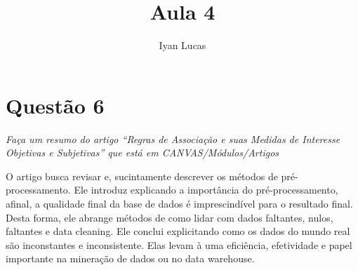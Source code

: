 \documentclass[oneside]{article}            %
\title{Aula 4}
\author{Iyan Lucas}
\begin{document}
\maketitle
\section{Questão 6}

\textit{Faça um resumo do artigo “Regras de Associação e suas Medidas de Interesse Objetivas e Subjetivas” que está em CANVAS/Módulos/Artigos}

O artigo busca revisar e, sucintamente descrever os métodos de pré-processamento.
Ele introduz explicando a importância do pré-processamento, afinal, a qualidade final da base de dados é imprescindível para o resultado final.
Desta forma, ele abrange métodos de como lidar com dados faltantes, nulos, faltantes e data cleaning.
Ele conclui explicitando como os dados do mundo real são inconstantes e inconsistente. 
Elas levam à uma eficiência, efetividade e papel importante na mineração de dados ou no data warehouse.
\end{document}

